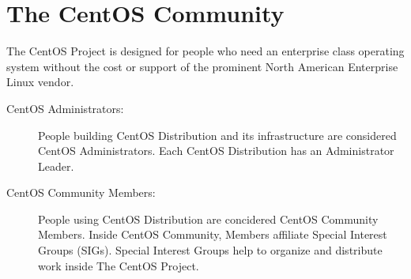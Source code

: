     \section{The CentOS Community}
\hypertarget{sec:Concepts:CentOS:Community}{}
      \label{sec:Concepts:CentOS:Community}

The CentOS Project is designed for people who need an enterprise class
operating system without the cost or support of the prominent North
American Enterprise Linux vendor.

\begin{description}

\item[CentOS Administrators:] People building CentOS Distribution and
its infrastructure are considered CentOS Administrators. Each CentOS
Distribution has an Administrator Leader.

\item[CentOS Community Members:] People using CentOS Distribution are
concidered CentOS Community Members.  Inside CentOS Community, Members
affiliate Special Interest Groups (SIGs). Special Interest Groups help
to organize and distribute work inside The CentOS Project.

\end{description}
